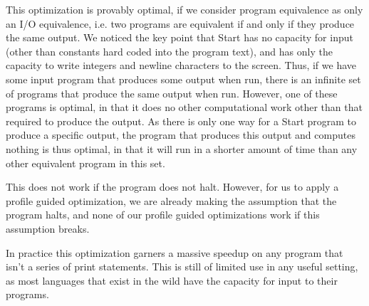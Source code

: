 \documentclass[12pt,letterpaper]{article}
\begin{document}
This optimization is provably optimal, if we consider program
equivalence as only an I/O equivalence, i.e. two programs are
equivalent if and only if they produce the same output. We noticed the
key point that Start has no capacity for input (other than constants
hard coded into the program text), and has only the capacity to write
integers and newline characters to the screen. Thus, if we have some
input program that produces some output when run, there is an infinite
set of programs that produce the same output when run. However, one of
these programs is optimal, in that it does no other computational work
other than that required to produce the output. As there is only one
way for a Start program to produce a specific output, the program that
produces this output and computes nothing is thus optimal, in that it
will run in a shorter amount of time than any other equivalent program
in this set.

This does not work if the program does not halt. However, for us to
apply a profile guided optimization, we are already making the
assumption that the program halts, and none of our profile guided
optimizations work if this assumption breaks.

In practice this optimization garners a massive speedup on any program
that isn't a series of print statements. This is still of limited use
in any useful setting, as most languages that exist in the wild have
the capacity for input to their programs.
\end{document}
